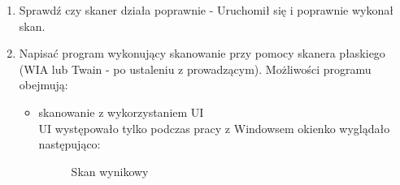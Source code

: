 \documentclass[a4paper,12pt]{extarticle}  %
\begin{document}
\begin{enumerate}
	\item Sprawdź czy skaner  działa poprawnie - Uruchomił się i poprawnie wykonał skan.
	\item Napisać program wykonujący skanowanie przy pomocy skanera płaskiego (WIA lub Twain - po ustaleniu z prowadzącym). Możliwości programu obejmują:
	      \begin{itemize}
		      \item skanowanie z wykorzystaniem  UI\\
		            UI występowało tylko podczas pracy z Windowsem okienko wyglądało następująco:
		            \begin{figure}[H]
			            \centering
		            \end{figure}
		            \begin{figure}[H]
			            \centering
			            \caption{Skan wynikowy}
\end{figure}
\end{itemize}
\end{enumerate}
\end{document}
